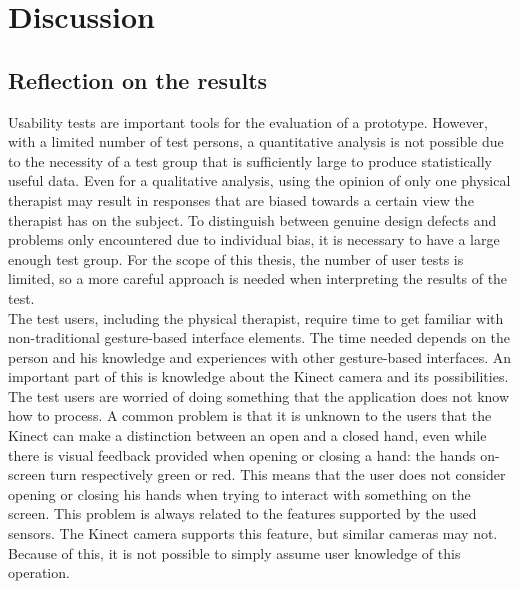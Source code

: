 \chapter{Discussion}


\section{Reflection on the results}

Usability tests are important tools for the evaluation of a prototype. However, with a limited number of test persons, a quantitative analysis is not possible due to the necessity of a test group that is sufficiently large to produce statistically useful data. Even for a qualitative analysis, using the opinion of only one physical therapist may result in responses that are biased towards a certain view the therapist has on the subject. To distinguish between genuine design defects and problems only encountered due to individual bias, it is necessary to have a large enough test group. For the scope of this thesis, the number of user tests is limited, so a more careful approach is needed when interpreting the results of the test.\\

The test users, including the physical therapist, require time to get familiar with non-traditional gesture-based interface elements. The time needed depends on the person and his knowledge and experiences with other gesture-based interfaces. An important part of this is knowledge about the Kinect camera and its possibilities. The test users are worried of doing something that the application does not know how to process. A common problem is that it is unknown to the users that the Kinect can make a distinction between an open and a closed hand, even while there is visual feedback provided when opening or closing a hand: the hands on-screen turn respectively green or red. This means that the user does not consider opening or closing his hands when trying to interact with something on the screen. This problem is always related to the features supported by the used sensors. The Kinect camera supports this feature, but similar cameras may not. Because of this, it is not possible to simply assume user knowledge of this operation.\\

